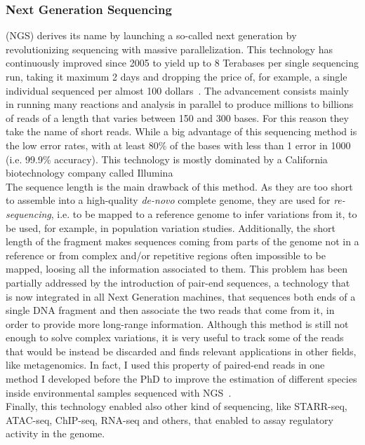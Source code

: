 \subsubsection{Next Generation Sequencing} (NGS) derives its name by launching a so-called next generation by revolutionizing sequencing with massive parallelization. This technology has continuously improved since 2005 to yield up to 8 Terabases per single sequencing run, taking it maximum 2 days and dropping the price of, for example, a single individual sequenced per almost 100 dollars~\cite{100dollars}. The advancement consists mainly in running many reactions and analysis in parallel to produce millions to billions of reads of a length that varies between 150 and 300 bases. For this reason they take the name of short reads. While a big advantage of this sequencing method is the low error rates, with at least 80\% of the bases with less than 1 error in 1000 (i.e. 99.9\% accuracy). This technology is mostly dominated by a California biotechnology company called Illumina \\
The sequence length is the main drawback of this method. As they are too short to assemble into a high-quality \emph{de-novo} complete genome, they are used for \emph{re-sequencing}, i.e. to be mapped to a reference genome to infer variations from it, to be used, for example, in population variation studies. Additionally, the short length of the fragment makes sequences coming from parts of the genome not in a reference or from complex and/or repetitive regions often impossible to be mapped, loosing all the information associated to them.
This problem has been partially addressed by the introduction of pair-end sequences, a technology that is now integrated in all Next Generation machines, that sequences both ends of a single DNA fragment and then associate the two reads that come from it, in order to provide more long-range information. Although this method is still not enough to solve complex variations, it is very useful to track some of the reads that would be instead be discarded and finds relevant applications in other fields, like metagenomics. In fact, I used this property of paired-end reads in one method I developed before the PhD to improve the estimation of different species inside environmental samples sequenced with NGS~\cite{metaprob2}. \\
Finally, this technology enabled also other kind of sequencing, like STARR-seq, ATAC-seq, ChIP-seq, RNA-seq and others, that enabled to assay regulatory activity in the genome.
